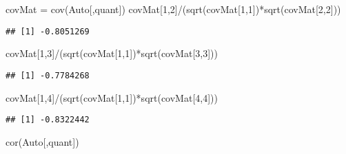 \documentclass[
]{article}
\newenvironment{Shaded}{\begin{snugshade}}{\end{snugshade}}
\newcommand{\DecValTok}[1]{\textcolor[rgb]{0.00,0.00,0.81}{#1}}
\newcommand{\FunctionTok}[1]{\textcolor[rgb]{0.00,0.00,0.00}{#1}}
\newcommand{\NormalTok}[1]{#1}
\newcommand{\OtherTok}[1]{\textcolor[rgb]{0.56,0.35,0.01}{#1}}
\newcommand{\SpecialCharTok}[1]{\textcolor[rgb]{0.00,0.00,0.00}{#1}}
\begin{document}
\begin{Shaded}
\begin{Highlighting}[]
\NormalTok{covMat }\OtherTok{=} \FunctionTok{cov}\NormalTok{(Auto[,quant])}
\NormalTok{covMat[}\DecValTok{1}\NormalTok{,}\DecValTok{2}\NormalTok{]}\SpecialCharTok{/}\NormalTok{(}\FunctionTok{sqrt}\NormalTok{(covMat[}\DecValTok{1}\NormalTok{,}\DecValTok{1}\NormalTok{])}\SpecialCharTok{*}\FunctionTok{sqrt}\NormalTok{(covMat[}\DecValTok{2}\NormalTok{,}\DecValTok{2}\NormalTok{]))}
\end{Highlighting}
\end{Shaded}

\begin{verbatim}
## [1] -0.8051269
\end{verbatim}

\begin{Shaded}
\begin{Highlighting}[]
\NormalTok{covMat[}\DecValTok{1}\NormalTok{,}\DecValTok{3}\NormalTok{]}\SpecialCharTok{/}\NormalTok{(}\FunctionTok{sqrt}\NormalTok{(covMat[}\DecValTok{1}\NormalTok{,}\DecValTok{1}\NormalTok{])}\SpecialCharTok{*}\FunctionTok{sqrt}\NormalTok{(covMat[}\DecValTok{3}\NormalTok{,}\DecValTok{3}\NormalTok{]))}
\end{Highlighting}
\end{Shaded}

\begin{verbatim}
## [1] -0.7784268
\end{verbatim}

\begin{Shaded}
\begin{Highlighting}[]
\NormalTok{covMat[}\DecValTok{1}\NormalTok{,}\DecValTok{4}\NormalTok{]}\SpecialCharTok{/}\NormalTok{(}\FunctionTok{sqrt}\NormalTok{(covMat[}\DecValTok{1}\NormalTok{,}\DecValTok{1}\NormalTok{])}\SpecialCharTok{*}\FunctionTok{sqrt}\NormalTok{(covMat[}\DecValTok{4}\NormalTok{,}\DecValTok{4}\NormalTok{]))}
\end{Highlighting}
\end{Shaded}

\begin{verbatim}
## [1] -0.8322442
\end{verbatim}

\begin{Shaded}
\begin{Highlighting}[]
\FunctionTok{cor}\NormalTok{(Auto[,quant])}
\end{Highlighting}
\end{Shaded}
\end{document}
